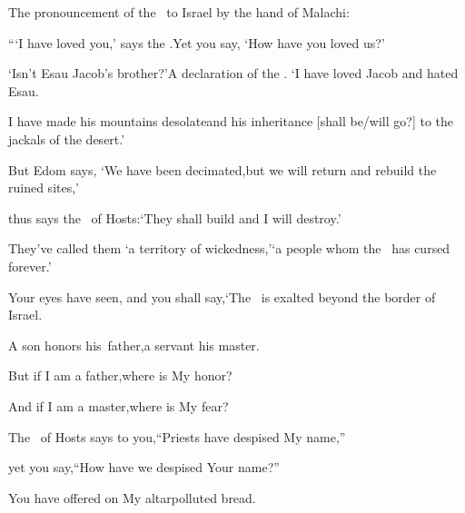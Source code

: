 
\begin{inparaenum}
   The pronouncement of the \lord\ to Israel by the hand of Malachi:\smallskip%
  
  \pa {} ``\thinspace`I have loved you,' says the \lord.\pa Yet you say, `How have you loved us?'%
  
  \pb `Isn't Esau Jacob's brother?'\pa A declaration of the \lord.%
  \pa `I have loved Jacob\pa {} and hated Esau.%
  
  \pb I have made his mountains desolate\pa and his inheritance [shall be/will go?] to the jackals%
  of the desert.'%
  
  \pa {} But Edom says, `We have been decimated,\pa but we will return and rebuild the ruined sites,'%
  
  \pb thus says the \lord\ of Hosts:\pa `They shall build and I will destroy.'%
  
  \pb They've called%
  them `a territory of wickedness,'\pa `a people whom the \lord\ has cursed forever.'%
  
  \pa {} Your eyes have seen, and you shall say,\pa `The \lord\ is exalted beyond the border of Israel.%
  
  \pb {} A son honors his\understood\ father,\pa a servant his master.%
  
  \pc But if I am a father,\pa where is My honor?%
  
  \pc And if I am a master,\pa where is My fear?%
  
  \pc The \lord\ of Hosts says to you,\pa ``Priests have despised My name,''%
  
  \pc yet you say,\pa ``How have we despised Your name?''%
  
  \pb {} You have offered on My altar\pa polluted%
  bread.%
  

\end{inparaenum}
